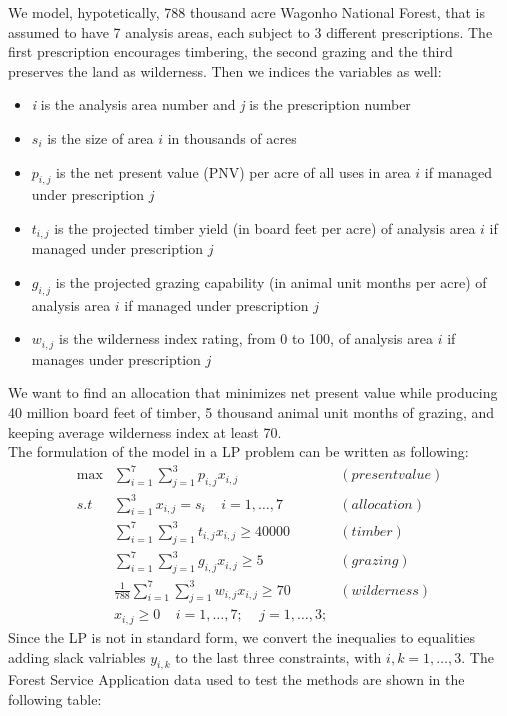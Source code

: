 \documentclass[a4paper,10 pt,titlepage,twoside]{book}
\theoremstyle{plain}
\theoremstyle{definition}
\theoremstyle{remark}
\begin{document}
We model, hypotetically, 788 thousand acre Wagonho National Forest, that is assumed to have 7 analysis areas, each subject to 3 different prescriptions. The first prescription encourages timbering, the second grazing and the third preserves the land as wilderness. Then we indices the variables as well:
\begin{itemize}
	\item \textit{i} is the analysis area number and \textit{j} is the prescription number
	\item $s_{i}$ is the size of area $i$ in thousands of acres
	\item $p_{i,j}$ is the net present value (PNV) per acre of all uses in area $i$ if managed under prescription $j$
	\item $t_{i,j}$ is the projected timber yield (in board feet per acre) of analysis area $i$ if managed under prescription $j$
	\item $g_{i,j}$ is the projected grazing capability (in animal unit months per acre) of analysis area $i$ if managed under prescription $j$
	\item $w_{i,j}$ is the wilderness index rating, from 0 to 100, of analysis area $i$ if manages under prescription $j$
\end{itemize}
We want to find an allocation that minimizes net present value while producing 40 million board feet of timber, 5 thousand animal unit months of grazing, and keeping average wilderness index at least 70.\\
The formulation of the model in a LP problem can be written as following:
\begin{align*}
\max&\sum_{i=1}^{7}\sum_{j=1}^{3} p_{i,j}x_{i,j}&(present value)\\
s.t& \sum_{i=1}^{3}x_{i,j}=s_{i}\;\;\;\;i = 1, \dots,7&(allocation)\\
&\sum_{i=1}^{7}\sum_{j=1}^{3} t_{i,j}x_{i,j}\geq 40000&(timber)\\
&\sum_{i=1}^{7}\sum_{j=1}^{3} g_{i,j}x_{i,j}\geq5&(grazing)\\
&\frac{1}{788}\sum_{i=1}^{7}\sum_{j=1}^{3} w_{i,j}x_{i,j}\geq 70&(wilderness)\\
&x_{i,j}\geq 0 \;\;\;\;i = 1,\dots,7;\;\;\;\;j = 1,\dots,3;
\end{align*}
Since the LP is not in standard form, we convert the inequalies to equalities adding slack valriables $y_{i,k}$ to the last three constraints, with $i, k = 1, \dots, 3$. The Forest Service Application data used to test the methods are shown in the following table:\\
\end{document}
